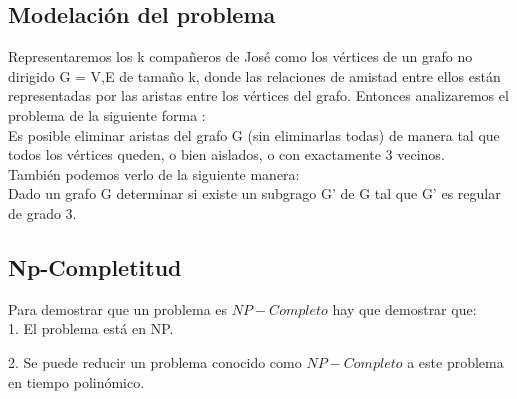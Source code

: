 \documentclass[
10pt, %
a4paper, %
oneside, %
headinclude,footinclude, %
BCOR5mm, %
]{scrartcl}
\begin{document}




\subsection{Modelación del problema}

Representaremos los k compañeros de José como los vértices de un grafo no dirigido G = {V,E} de tamaño k, donde las relaciones de amistad entre ellos están representadas
por las aristas entre los vértices del grafo. Entonces analizaremos el problema de la siguiente forma :\\

Es posible eliminar aristas del grafo G (sin eliminarlas todas) de manera tal que todos los vértices queden, o bien aislados, o con exactamente 3 vecinos. \\

También podemos verlo de la siguiente manera: \\

Dado un grafo G determinar si existe un subgrago G' de G tal que G' es regular de grado 3.


\subsection{Np-Completitud}

Para demostrar que un problema es $NP-Completo$ hay que demostrar que:\\

1. El problema está en NP.

2. Se puede reducir un problema conocido como $NP-Completo$ a este problema en tiempo polinómico.\\
\end{document}
